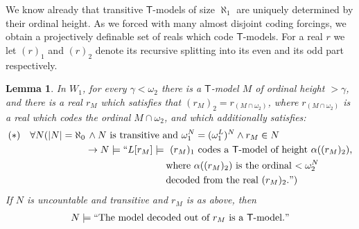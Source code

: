 \documentclass[a4paper,12pt]{article}
\newtheorem{lemma}[theorem]{Lemma}
\newcommand{\T}{\mathsf{T}}
\begin{document}
We know already that transitive $\T$-models of size $\aleph_1$ are uniquely determined by their ordinal height. As we forced with many almost disjoint coding forcings, we obtain a projectively definable set of reals which code $\T$-models. For a real $r$ we let $(r)_1$ and $(r)_2$ denote its recursive splitting into its even and its odd part respectively.
\begin{lemma}\label{realscodeTmodels}
In $W_1$, for every $\gamma < \omega_2$ there is a $\T$-model $M$ of ordinal height $>\gamma$, and there is a real $r_M$ which satisfies that $(r_M)_2 = r_{(M \cap \omega_2)}$, where $r_{(M \cap \omega_2)}$ is a real which codes the ordinal $M \cap \omega_2$, and which additionally satisfies:
\begin{align*}
(\ast) \quad \forall N (|N| = \aleph_0& \, \land N \text{ is transitive and }  \omega_1^N=(\omega_1^{L})^N  \land r_M \in N \\& \rightarrow
N \models  ``L[r_M] \models \text{ $(r_M)_1$ codes a $\T$-model   of height $\alpha((r_M)_2)$,} \\& \qquad \qquad \qquad \qquad \text{ where $\alpha((r_M)_2)$ is the ordinal $< \omega_2^{N}$ } \\&\qquad \qquad \qquad \qquad \text{ decoded from the real $(r_M)_2$.}")
\end{align*}
If $N$ is uncountable and transitive  and $r_M$ is as above, then
\begin{align*}
N \models ``\text{The model decoded out of $r_M$ is a $\T$-model.}"
\end{align*}

\end{lemma}
\end{document}
